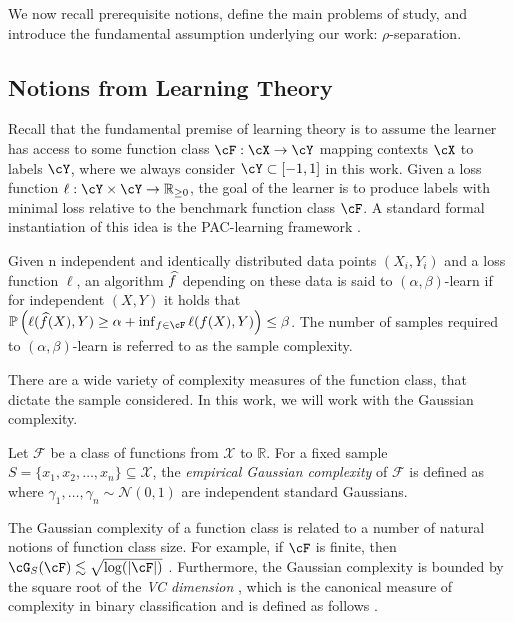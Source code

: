 
We now recall prerequisite notions, define the main problems of study, and introduce the fundamental assumption underlying our work: $\rho$-separation.  


\subsection{Notions from Learning Theory}\label{ssec:prelims_learning}
Recall that the fundamental premise of learning theory is to assume the learner has access to some function class $\cF: \cX \to \cY$ mapping contexts $\cX$ to labels $\cY$, where we always consider $\cY \subset [-1,1]$ in this work.  Given a loss function $\ell: \cY \times \cY \to \rr_{\geq 0}$, the goal of the learner is to produce labels with minimal loss relative to the benchmark function class $\cF$.  A standard formal instantiation of this idea is the PAC-learning framework \cite{vapnik1964class,valiant1984theory}. 

\begin{definition}\label{def:pac}
    Given n independent and identically distributed data points $(X_i, Y_i)$ and a loss function $\ell$, an algorithm $\widehat{f}$ depending on these data is said to $(\alpha, \beta)$-learn if for independent $(X, Y)$ it holds that $\pp\left( \ell(\fhat(X), Y) \geq \alpha + \inf_{f \in \cF} \ell(f(X), Y) \right) \leq \beta$.
    The number of samples required to $(\alpha, \beta)$-learn is referred to as the sample complexity.
\end{definition}

 
There are a wide variety of complexity measures of the function class, that dictate the sample  considered. 
In this work, we will work with the Gaussian complexity. 
\begin{definition}
    Let \(\mathcal{F}\) be a class of functions from \(\mathcal{X}\) to \(\mathbb{R}\). For a fixed sample \(S = \{x_1, x_2, \ldots, x_n\} \subseteq \mathcal{X}\), the \emph{empirical Gaussian complexity} of \(\mathcal{F}\) is defined as \iftoggle{colt}{$\mathcal{G}_S(\mathcal{F}) = \mathbb{E}_{\xi}\left[ \sup_{f \in \mathcal{F}} \frac{1}{ \sqrt{n}} \sum_{i=1}^n \xi_i\, f(x_i) \right]$,}{
\begin{align}
    \mathcal{G}_S(\mathcal{F}) = \mathbb{E}_{\xi}\left[ \sup_{f \in \mathcal{F}} \frac{1}{ \sqrt{n}} \sum_{i=1}^n \xi_i\, f(x_i) \right],
\end{align}
    }
    where \(\gamma_1, \ldots, \gamma_n \sim \mathcal{N}(0,1)\) are independent standard Gaussians. 
\end{definition}
The Gaussian complexity of a function class is related to a number of natural notions of function class size.  
For example, if $\cF$ is finite, then $\cG_S(\cF) \lesssim \sqrt{\log(\abs{\cF})}$ \citep[Theorem 2.5]{boucheron2013concentration}. 
Furthermore, the Gaussian complexity is bounded by the square root of the \emph{VC dimension} \citep[Theorem 6]{bartlett2002rademacher}, which is the canonical measure of complexity in binary classification and is defined as follows \citep{shai}. 

